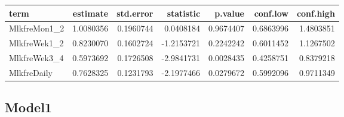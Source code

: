 \documentclass[]{article}
\newenvironment{Shaded}{\begin{snugshade}}{\end{snugshade}}
\newcommand{\DataTypeTok}[1]{\textcolor[rgb]{0.13,0.29,0.53}{#1}}
\newcommand{\KeywordTok}[1]{\textcolor[rgb]{0.13,0.29,0.53}{\textbf{#1}}}
\newcommand{\NormalTok}[1]{#1}
\newcommand{\OperatorTok}[1]{\textcolor[rgb]{0.81,0.36,0.00}{\textbf{#1}}}
\newcommand{\OtherTok}[1]{\textcolor[rgb]{0.56,0.35,0.01}{#1}}
\newcommand{\StringTok}[1]{\textcolor[rgb]{0.31,0.60,0.02}{#1}}
\begin{document}
\begin{Shaded}
\end{Shaded}

\begin{longtable}[]{@{}lrrrrrr@{}}
\toprule
term & estimate & std.error & statistic & p.value & conf.low &
conf.high\tabularnewline
\midrule
\endhead
MlkfreMon1\_2 & 1.0080356 & 0.1960744 & 0.0408184 & 0.9674407 &
0.6863996 & 1.4803851\tabularnewline
MlkfreWek1\_2 & 0.8230070 & 0.1602724 & -1.2153721 & 0.2242242 &
0.6011452 & 1.1267502\tabularnewline
MlkfreWek3\_4 & 0.5973692 & 0.1726508 & -2.9841731 & 0.0028435 &
0.4258751 & 0.8379218\tabularnewline
MlkfreDaily & 0.7628325 & 0.1231793 & -2.1977466 & 0.0279672 & 0.5992096
& 0.9711349\tabularnewline
\bottomrule
\end{longtable}

\hypertarget{model1-5}{%
\subsection{Model1}\label{model1-5}}

\begin{Shaded}
\end{Shaded}
\end{document}

